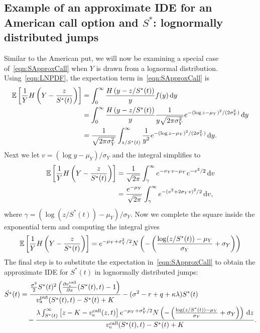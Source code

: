 \subsection{Example of an approximate IDE for an American call option and $S^*$: lognormally distributed jumps}
Similar to the American put, we will now be examining a special case of~\eqref{eqn:SApproxCall} when $Y$ is drawn from a lognormal distribution. Using~\eqref{eqn:LNPDF}, the expectation term in~\eqref{eqn:SApproxCall} is
	\begin{align*}
		\mathbb E\left[ \frac{1}{Y}H\left( Y - \frac{z}{S^*(t)} \right) \right] &= \int_0^\infty \frac{H\left( y -  z/S^*(t) \right)}{y}f(y) \, \mathrm d y \\ 
		&= \int_0^\infty \frac{H\left(y -  z/S^*(t) \right)}{y}\frac{1}{y\sqrt{2\pi\sigma_Y^2}}e^{-(\log z - \mu_Y)^2/(2\sigma_Y^2)} \, \mathrm d y \\ 
		&= \frac{1}{\sqrt{2\pi\sigma_Y^2}}\int_{z/S^*(t)}^\infty \frac{1}{y^2}e^{-(\log z - \mu_Y)^2/(2\sigma_Y^2)} \, \mathrm d y.
	\end{align*}
Next we let $v = (\log y - \mu_Y)/\sigma_Y$ and the integral simplifies to
	\begin{align*}
		\mathbb E\left[ \frac{1}{Y}H\left( Y - \frac{z}{S^*(t)} \right)\right] &= \frac{1}{\sqrt{2\pi}} \int_{\gamma}^\infty e^{-\sigma_Y v - \mu_Y}e^{-v^2/2} \, \mathrm d v \\
		&=  \frac{e^{-\mu_Y}}{\sqrt{2\pi}} \int_{\gamma}^{\infty} e^{-(v^2 + 2\sigma_Yv)^2/2} \, \mathrm d v,
	\end{align*}
where $\gamma = (\log(z/S^*(t)) - \mu_Y)/\sigma_Y$. Now we complete the square inside the exponential term and computing the integral gives
	\begin{align*}
		\mathbb E\left[ \frac{1}{Y}H\left( Y - \frac{z}{S^*(t)} \right) \right] = e^{-\mu_Y + \sigma_Y^2/2}N\left(  - \left(\frac{\log(z/S^*(t)) - \mu_Y}{\sigma_Y} + \sigma_Y \right)\right)
	\end{align*}
The final step is to substitute the expectation in~\eqref{eqn:SApproxCall} to obtain the approximate IDE for $S^*(t)$ in lognormally distributed jumps:
	\begin{equation}
		\label{eqn:SApproxCallLN}
		\begin{split}
		\dot{S^*}(t) &= \frac{\frac{\sigma^2}{2}S^*(t)^2\left( \frac{\partial  v_{\text{e}}^{\text{call}} }{\partial x}(S^*(t),t) - 1\right)}{v_{\text{a}}^{\text{put}}(S^*(t),t) - S^*(t) + K} - (\sigma^2 - r + q +\kappa\lambda)S^*(t)  \\
				&\quad{} - \frac{\lambda\int_{S^*(t)}^\infty \left[z - K -  v_{\text{e}}^{\text{call}}(z,t)\right]  e^{-\mu_Y + \sigma_Y^2/2}N\left( - \left(\frac{\log(z/S^*(t)) - \mu_Y}{\sigma_Y} + \sigma_Y \right)\right) \, \mathrm d z}{ v_{\text{e}}^{\text{call}}(S^*(t),t) - S^*(t) + K} .
		\end{split}
	\end{equation}



